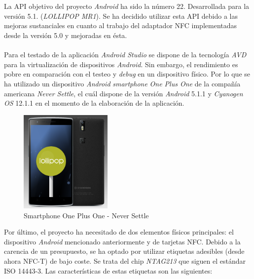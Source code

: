 \documentclass[../PFC.tex]{subfiles}
\begin{document}
\\\\
La API objetivo del proyecto \textit{Android} ha sido la número 22. Desarrollada para la versión 5.1. (\textit{LOLLIPOP MR1}). Se ha decidido utilizar esta API debido a las mejoras sustanciales en cuanto al trabajo del adaptador NFC implementadas desde la versión 5.0\cite{androidAPI21} y mejoradas en ésta\cite{androidAPI22}. 
\\\\
Para el testado de la aplicación \textit{Android Studio} se dispone de la tecnología \textit{AVD} para la virtualización de dispositivos \textit{Android}. Sin embargo, el rendimiento es pobre en comparación con el testeo y \textit{debug} en un dispositivo físico. Por lo que se ha utilizado un dispositivo \textit{Android} \textit{smartphone} \textit{One Plus One} de la compañía americana \textit{Never Settle}, el cuál dispone de la versión \textit{Android} 5.1.1 y \textit{Cyanogen OS} 12.1.1  en el momento de la elaboración de la aplicación. 

\begin{figure}[H]
  \centering
  \includegraphics[width=0.4\textwidth]{./img/opo}
  \caption{Smartphone One Plus One - Never Settle}
  \label{img:opo}
\end{figure} 

Por último, el proyecto ha necesitado de dos elementos físicos principales: el dispositivo \textit{Android} mencionado anteriormente y de tarjetas NFC. Debido a la carencia de un presupuesto, se ha optado por utilizar etiquetas adesibles (desde ahora NFC-T) de bajo coste. Se trata del chip \textit{NTAG213} que siguen el estándar ISO 14443-3\cite{iso14443}. Las características de estas etiquetas son las siguientes:
\end{document}
